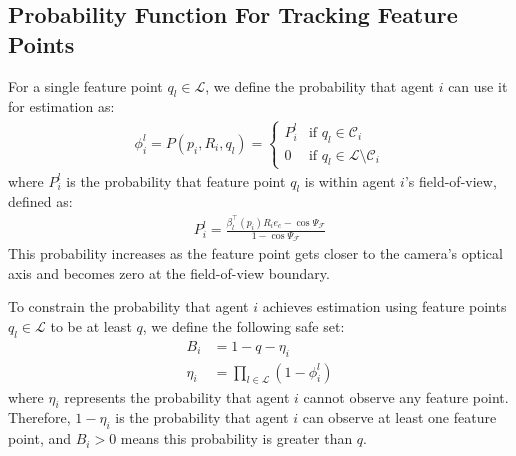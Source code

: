 \documentclass[fleqn,10pt,twocolumn]{SICE_FES25}
\theoremstyle{definition}
\theoremstyle{plain}
\begin{document}
\subsection{Probability Function For Tracking Feature Points}

For a single feature point $q_l \in \mathcal{L}$, we define the probability that agent $i$ can use it for estimation as:
\begin{equation}
\begin{aligned}
\phi_i^l = P(p_i, R_i, q_l) = 
\begin{cases}
P_i^l & \text{if } q_l \in {\mathcal{C}}_i \\
0 & \text{if } q_l \in \mathcal{L} \setminus {\mathcal{C}}_i
\end{cases}
\label{eq:multi_probability}
\end{aligned}
\end{equation}
where $P_i^l$ is the probability that feature point $q_l$ is within agent $i$'s field-of-view, defined as:
\begin{equation}
\begin{aligned}
P_i^l = \frac{\beta_l^\top(p_i) R_i e_c - \cos\Psi_{\mathcal{F}}}{1 - \cos\Psi_{\mathcal{F}}}
\label{eq:visibility_probability}
\end{aligned}
\end{equation}
This probability increases as the feature point gets closer to the camera's optical axis and becomes zero at the field-of-view boundary.

To constrain the probability that agent $i$ achieves estimation using feature points $q_l \in \mathcal{L}$ to be at least $q$, we define the following safe set:
\begin{equation}
\begin{aligned}
B_i &= 1 - q - \eta_i \\
\eta_i &= \prod_{l \in \mathcal{L}} (1 - \phi_i^l)
\label{eq:multi_safe_set}
\end{aligned}
\end{equation}
where $\eta_i$ represents the probability that agent $i$ cannot observe any feature point. Therefore, $1 - \eta_i$ is the probability that agent $i$ can observe at least one feature point, and $B_i > 0$ means this probability is greater than $q$.
\end{document}
